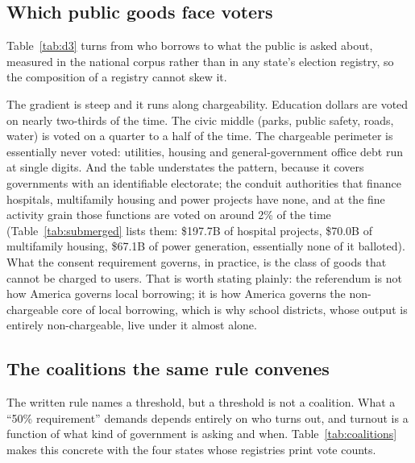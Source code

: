 \subsection{Which public goods face voters}
Table~\ref{tab:d3} turns from who borrows to what the public is asked about, measured in the national corpus rather than in any state's election registry, so the composition of a registry cannot skew it.


The gradient is steep and it runs along chargeability. Education dollars are voted on nearly two-thirds of the time. The civic middle (parks, public safety, roads, water) is voted on a quarter to a half of the time. The chargeable perimeter is essentially never voted: utilities, housing and general-government office debt run at single digits. And the table understates the pattern, because it covers governments with an identifiable electorate; the conduit authorities that finance hospitals, multifamily housing and power projects have none, and at the fine activity grain those functions are voted on around 2\% of the time (Table~\ref{tab:submerged} lists them: \$197.7B of hospital projects, \$70.0B of multifamily housing, \$67.1B of power generation, essentially none of it balloted). What the consent requirement governs, in practice, is the class of goods that cannot be charged to users. That is worth stating plainly: the referendum is not how America governs local borrowing; it is how America governs the non-chargeable core of local borrowing, which is why school districts, whose output is entirely non-chargeable, live under it almost alone.

\subsection{The coalitions the same rule convenes}
The written rule names a threshold, but a threshold is not a coalition. What a ``50\% requirement'' demands depends entirely on who turns out, and turnout is a function of what kind of government is asking and when. Table~\ref{tab:coalitions} makes this concrete with the four states whose registries print vote counts.

